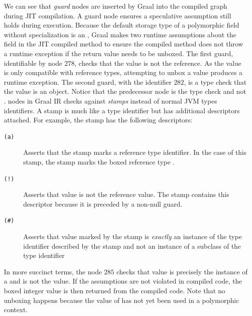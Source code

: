 We can see that \textit{guard} nodes are inserted by Graal into the compiled graph during JIT compilation.
A guard node ensures a speculative assumption still holds during execution.
Because the default storage type of a polymorphic field without specialization is an , Graal makes two runtime assumptions about the field in the JIT compiled  method to ensure the compiled method does not throw a runtime exception if the return value needs to be unboxed.
The first guard, identifiable by node $278$, checks that the value is not the  reference.
As the  value is only compatible with reference types, attempting to unbox a  value produces a runtime exception.
The second guard, with the identifier $282$, is a type check that the value is an  object.
Notice that the predecessor node is the type check  and not .
 nodes in Graal IR checks against \textit{stamps} instead of normal JVM types identifiers.
A stamp is much like a type identifier but has additional descriptors attached.
For example, the stamp  has the following descriptors:

\begin{description}
	\item[\texttt{(a)}] Asserts that the stamp marks a reference type identifier. In the case of this stamp, the stamp marks the boxed reference type .
	\item[\texttt{(!)}] Asserts that value is not the  reference value. The stamp contains this descriptor because it is preceded by a non-null guard.
	\item[\texttt{(\#)}] Asserts that value marked by the stamp is \textit{exactly} an instance of the type identifier described by the stamp and not an instance of a subclass of the type identifier
\end{description}

In more succinct terms, the  node $285$ checks that value is precisely the instance of a  and is not the  value. 
If the assumptions are not violated in compiled code, the boxed integer value is then returned from the compiled code.
Note that no unboxing happens because the value of  has not yet been used in a polymorphic context.


